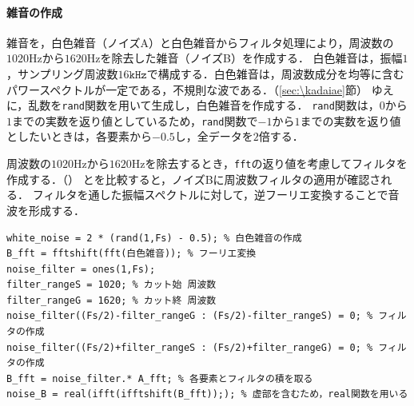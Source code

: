 \paragraph{雑音の作成}
雑音を，白色雑音（ノイズA）と白色雑音からフィルタ処理により，周波数の\(1020\textrm{Hz}\)から\(1620\textrm{Hz}\)を除去した雑音（ノイズB）を作成する．
白色雑音は，振幅\(1\)，サンプリング周波数\(16\texttt{kHz}\)で構成する．白色雑音は，周波数成分を均等に含むパワースペクトルが一定である，不規則な波である．（\ref{sec:\kadaiae}節）
ゆえに，乱数を\texttt{rand}関数を用いて生成し，白色雑音を作成する．
\texttt{rand}関数は，\(0\)から\(1\)までの実数を返り値としているため，\texttt{rand}関数で\(-1\)から\(1\)までの実数を返り値としたいときは，各要素から\(-0.5\)し，全データを\(2\)倍する．\par
周波数の\(1020\textrm{Hz}\)から\(1620\textrm{Hz}\)を除去するとき，\texttt{fft}の返り値を考慮してフィルタを作成する．（）
とを比較すると，ノイズBに周波数フィルタの適用が確認される．
フィルタを通した振幅スペクトルに対して，逆フーリエ変換することで音波を形成する．
\begin{lstlisting}[caption={白色雑音の作成},label={src:白色雑音の作成}]
white_noise = 2 * (rand(1,Fs) - 0.5); % 白色雑音の作成
B_fft = fftshift(fft(白色雑音)); % フーリエ変換
noise_filter = ones(1,Fs);
filter_rangeS = 1020; % カット始 周波数
filter_rangeG = 1620; % カット終 周波数
noise_filter((Fs/2)-filter_rangeG : (Fs/2)-filter_rangeS) = 0; % フィルタの作成
noise_filter((Fs/2)+filter_rangeS : (Fs/2)+filter_rangeG) = 0; % フィルタの作成
B_fft = noise_filter.* A_fft; % 各要素とフィルタの積を取る
noise_B = real(ifft(ifftshift(B_fft));); % 虚部を含むため，real関数を用いる
\end{lstlisting}
